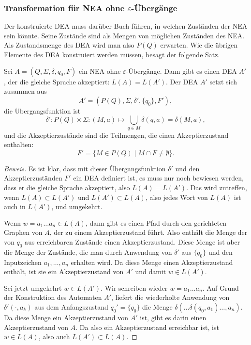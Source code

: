 \subsubsection{Transformation für NEA ohne $\varepsilon$-Übergänge}
Der konstruierte DEA muss darüber Buch führen, in welchen Zuständen
der NEA sein könnte.
Seine Zustände sind als Mengen von möglichen Zuständen des NEA.
Als Zustandsmenge des DEA wird man also $P(Q)$ 
erwarten.
Wie die übrigen Elemente des DEA konstruiert werden müssen,
besagt der folgende Satz.

\begin{satz}
\label{satz_neadea_eps}
Sei $A=(Q,\Sigma,\delta,q_0,F)$ ein NEA ohne $\varepsilon$-Übergänge.
Dann gibt es einen DEA $A'$, der die gleiche Sprache akzeptiert: $L(A)=L(A')$.
Der DEA $A'$ setzt sich zusammen aus
\[
A'=
(P(Q), \Sigma, \delta', \{q_0\}, F'),
\]
die Übergangsfunktion ist
\[
\delta'\colon P(Q)\times \Sigma: (M, a)\mapsto \bigcup_{q\in M} \delta(q,a)
=\delta(M,a),
\]
und die Akzeptierzustände sind die Teilmengen, die einen Akzeptierzustand
enthalten:
\[
F'=\{M\in P(Q)\;|\;M\cap F\ne \emptyset\}.
\]
\end{satz}
\begin{proof}[Beweis]
Es ist klar, dass mit dieser Übergangsfunktion $\delta'$ und den
Akzeptierzuständen $F'$ ein DEA definiert ist, es muss nur noch
bewiesen werden, dass er die gleiche Sprache akzeptiert, also
$L(A)=L(A')$.
Das wird zutreffen, wenn $L(A)\subset L(A')$ und
$L(A')\subset L(A)$, also jedes Wort von $L(A)$ ist auch in $L(A')$,
und umgekehrt.

Wenn $w=a_1\dots a_n\in L(A)$, dann gibt es einen Pfad durch den gerichteten
Graphen von $A$, der zu einem Akzeptierzustand führt.
Also enthält
die Menge der von $q_0$ aus erreichbaren Zustände einen Akzeptierzustand.
Diese Menge ist aber die Menge der Zustände, die man durch Anwendung
von $\delta'$ aus $\{q_0\}$ und den Inputzeichen $a_1,\dots,a_n$ erhalten
wird.
Da diese Menge einen Akzeptierzustand enthält, ist sie ein
Akzeptierzustand von $A'$ und damit $w\in L(A')$.

Sei jetzt umgekehrt $w\in L(A')$.
Wir schreiben wieder $w=a_1\dots a_n$.
Auf Grund der Konstruktion des Automaten $A'$, liefert die wiederholte
Anwendung von $\delta'(\cdot, a_k)$ aus dem Anfangszustand $q_0'=\{q_0\}$
die Menge $\delta(\dots\delta(q_0, a_1)\dots ,a_n)$.
Da diese Menge ein
Akzeptierzustand von $A'$ ist, gibt es darin einen Akzeptierzustand
von $A$.
Da also ein Akzeptierzustand erreichbar ist, ist $w\in L(A)$,
also auch $L(A')\subset L(A)$.
\end{proof}


